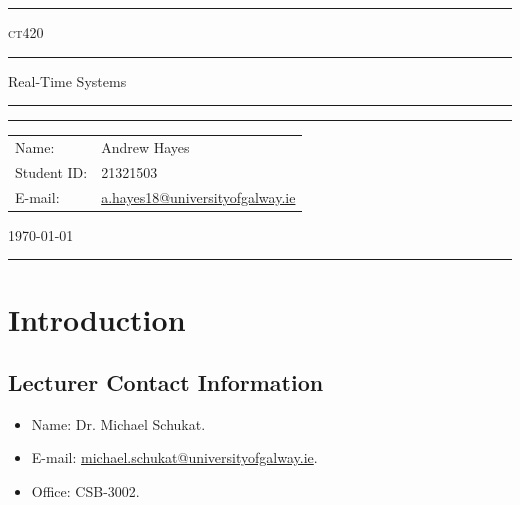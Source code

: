 \documentclass[a4paper,11pt]{article}
\author{Andrew Hayes}
\begin{document}
\begin{titlepage}
    \begin{center}
        \hrule
        \vspace*{0.6cm}
        \Huge \textsc{ct420}
        \vspace*{0.6cm}
        \hrule
        \LARGE
       \vspace{0.5cm}
       Real-Time Systems
       \vspace{0.5cm}
       \hrule

       \vfill

       \hrule
        \begin{minipage}{0.495\textwidth} 
            \vspace{0.4em}
            \raggedright
            \normalsize 
            \begin{tabular}{@{}l l}
                Name: & Andrew Hayes \\
                Student ID: & 21321503 \\
                E-mail: & \href{mailto://a.hayes18@universityofgalway.ie}{a.hayes18@universityofgalway.ie} \\
            \end{tabular}
        \end{minipage}
        \begin{minipage}{0.495\textwidth} 
            \raggedleft
            \vspace*{0.8cm}
            \Large
            \today
            \vspace*{0.6cm}
        \end{minipage}
        \medskip\hrule 
    \end{center}
\end{titlepage}

\newpage
\tableofcontents
\newpage
\setcounter{page}{1}

\section{Introduction}
\subsection{Lecturer Contact Information}
\begin{itemize}
    \item   Name: Dr. Michael Schukat.
    \item   E-mail: \href{mailto://michael.schukat@universityofgalway.ie}{michael.schukat@universityofgalway.ie}.
    \item   Office: CSB-3002.
\end{itemize}
\end{document}
